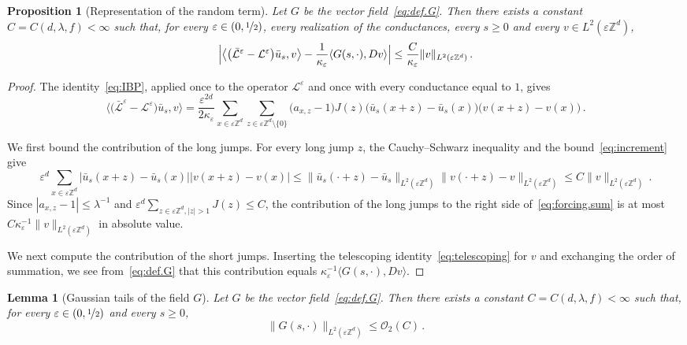 \documentclass[11pt]{amsart}
\newtheorem{proposition}[theorem]{Proposition}
\newtheorem{lemma}[theorem]{Lemma}
\numberwithin{equation}{section}
\newcommand{\Z}{\mathbb{Z}}
\newcommand{\cO}{\mathcal{O}}
\newcommand{\eps}{\varepsilon}
\newcommand{\Leps}{\mathcal{L}^\varepsilon}
\newcommand{\Lbar}{\bar{\mathcal{L}}^\varepsilon}
\newcommand{\nf}{\nicefrac}
\begin{document}
\begin{proposition}[Representation of the random term] \label{prop:forcing}
Let $G$ be the vector field~\eqref{eq:def.G}.
Then there exists a constant $C = C(d, \lambda, f) < \infty$ such that, for every $\eps \in (0, \nf12)$, every realization of the conductances, every $s \geq 0$ and every $v \in L^2(\eps \Z^d)$,
\begin{equation} \label{eq:forcing}
    \Bigl| \bigl\langle \bigl( \Lbar - \Leps \bigr) \bar u_s, v \bigr\rangle - \frac{1}{\kappa_\eps} \langle G(s, \cdot), D v \rangle \Bigr| \leq \frac{C}{\kappa_\eps} \|v\|_{L^2(\eps \Z^d)}\,.
\end{equation}
\end{proposition}

\begin{proof}
The identity~\eqref{eq:IBP}, applied once to the operator $\Leps$ and once with every conductance equal to $1$, gives
\begin{equation} \label{eq:forcing.sum}
     \bigl\langle \bigl( \Lbar - \Leps \bigr) \bar u_s, v \bigr\rangle = \frac{\eps^{2d}}{2 \kappa_\eps} \sum_{x \in \eps \Z^d} \sum_{z \in \eps \Z^d \setminus \{0\}} \bigl( a_{x,z} - 1 \bigr) J(z) \bigl( \bar u_s(x + z) - \bar u_s(x) \bigr) \bigl( v(x + z) - v(x) \bigr)\,.
\end{equation}

We first bound the contribution of the long jumps.
For every long jump $z$, the Cauchy--Schwarz inequality and the bound~\eqref{eq:increment} give
\begin{equation*}
    \eps^d \sum_{x \in \eps \Z^d} \bigl| \bar u_s(x + z) - \bar u_s(x) \bigr| \bigl| v(x + z) - v(x) \bigr| \leq \|\bar u_s(\cdot + z) - \bar u_s\|_{L^2(\eps \Z^d)} \|v(\cdot + z) - v\|_{L^2(\eps \Z^d)} \leq C \|v\|_{L^2(\eps \Z^d)}\,.
\end{equation*}
Since $|a_{x,z} - 1| \leq \lambda^{-1}$ and $\eps^d \sum_{z \in \eps \Z^d, |z| > 1} J(z) \leq C$, the contribution of the long jumps to the right side of~\eqref{eq:forcing.sum} is at most $C \kappa_\eps^{-1} \|v\|_{L^2(\eps \Z^d)}$ in absolute value.

We next compute the contribution of the short jumps.
Inserting the telescoping identity~\eqref{eq:telescoping} for $v$ and exchanging the order of summation, we see from~\eqref{eq:def.G} that this contribution equals $\kappa_\eps^{-1} \langle G(s, \cdot), D v \rangle$.
\end{proof}


\begin{lemma}[Gaussian tails of the field $G$] \label{lem:G}
Let $G$ be the vector field~\eqref{eq:def.G}.
Then there exists a constant $C = C(d, \lambda, f) < \infty$ such that, for every $\eps \in (0, \nf12)$ and every $s \geq 0$,
\begin{equation*}
    \|G(s, \cdot)\|_{L^2(\eps \Z^d)} \leq \cO_2(C)\,.
\end{equation*}
\end{lemma}
\end{document}
